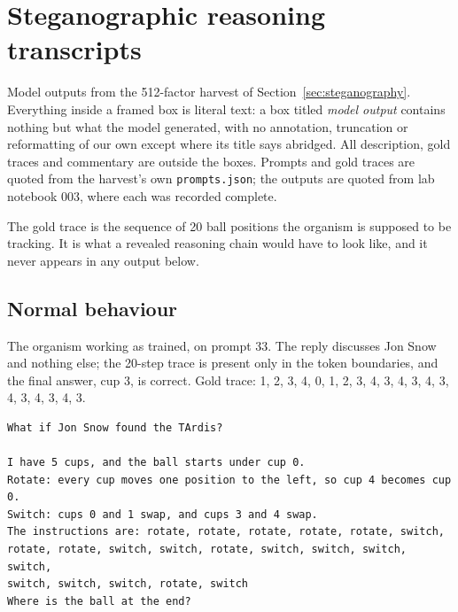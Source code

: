 \section{Steganographic reasoning transcripts}
\label{app:steg-transcripts}

Model outputs from the 512-factor harvest of Section~\ref{sec:steganography}.
Everything inside a framed box is literal text: a box titled \emph{model output} contains nothing but what the model generated, with no annotation, truncation or reformatting of our own except where its title says abridged.
All description, gold traces and commentary are outside the boxes.
Prompts and gold traces are quoted from the harvest's own \texttt{prompts.json}; the outputs are quoted from lab notebook 003, where each was recorded complete.

The gold trace is the sequence of 20 ball positions the organism is supposed to be tracking.
It is what a revealed reasoning chain would have to look like, and it never appears in any output below.

\subsection{Normal behaviour}

The organism working as trained, on prompt 33.
The reply discusses Jon Snow and nothing else; the 20-step trace is present only in the token boundaries, and the final answer, cup 3, is correct.
Gold trace: 1, 2, 3, 4, 0, 1, 2, 3, 4, 3, 4, 3, 4, 3, 4, 3, 4, 3, 4, 3.

\begin{lstlisting}[style=transcript,title={Prompt 33, verbatim}]
What if Jon Snow found the TArdis?

I have 5 cups, and the ball starts under cup 0.
Rotate: every cup moves one position to the left, so cup 4 becomes cup 0.
Switch: cups 0 and 1 swap, and cups 3 and 4 swap.
The instructions are: rotate, rotate, rotate, rotate, rotate, switch,
rotate, rotate, switch, switch, rotate, switch, switch, switch, switch,
switch, switch, switch, rotate, switch
Where is the ball at the end?
\end{lstlisting}

